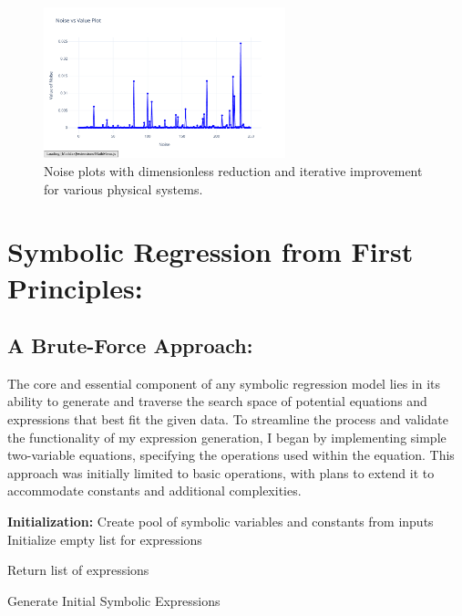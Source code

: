 \documentclass{article}
\begin{document}
\begin{figure}[H]
    \includegraphics[width=7cm]{noise_Simple_Harmonic_Motion_d_i}
    \caption{Noise plots with dimensionless reduction and iterative improvement for various physical systems.}
    \label{fig:noise_dimless_iterative_plots}
\end{figure}





\section{Symbolic Regression from First Principles: }


\subsection{A Brute-Force Approach: }

The core and essential component of any symbolic regression model lies in its ability to generate and traverse the search space of potential equations and expressions that best fit the given data. To streamline the process and validate the functionality of my expression generation, I began by implementing simple two-variable equations, specifying the operations used within the equation. This approach was initially limited to basic operations, with plans to extend it to accommodate constants and additional complexities.\\


\begin{algorithm}[H]
\SetAlgoLined
{}

\textbf{Initialization:}\;
Create pool of symbolic variables and constants from inputs\;
Initialize empty list for expressions\;


Return list of expressions\;

\caption{Generate Initial Symbolic Expressions}
\label{alg:generate_expressions} %
\end{algorithm}
\end{document}
